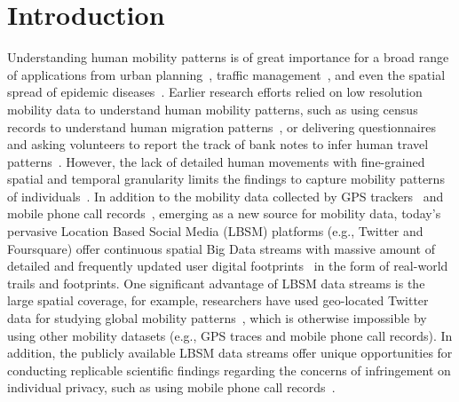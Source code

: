 \documentclass[ijgi,article,submit,moreauthors,pdftex,10pt,a4paper]{mdpi}
\theoremstyle{mdpi}
\newcounter{ex}
\newcounter{re}
\theoremstyle{mdpidefinition}
\begin{document}


\section{Introduction}
Understanding human mobility patterns is of great importance for a broad range of applications from urban planning~\cite{zheng2008understanding}, traffic management~\cite{jiang2009characterizing}, and even the spatial spread of epidemic diseases~\cite{belik2011natural}.
Earlier research efforts relied on low resolution mobility data to understand human mobility patterns, such as using census records to understand human migration patterns~\cite{greenwood1985human}, or delivering questionnaires and asking volunteers to report the track of bank notes to infer human travel patterns~\cite{brockmann2006scaling}.
However, the lack of detailed human movements with fine-grained spatial and temporal granularity limits the findings to capture mobility patterns of individuals~\cite{gonzalez2008understanding,Jurdak2015}.
In addition to the mobility data collected by GPS trackers~\cite{zheng2008understanding, rhee2011levy} and mobile phone call records~\cite{gonzalez2008understanding,sevtsuk2010does,kung2014exploring}, 
emerging as a new source for mobility data, today's pervasive Location Based Social Media (LBSM) platforms (e.g., Twitter and Foursquare) offer continuous spatial Big Data streams with massive amount of detailed and frequently updated user digital footprints~\cite{thatcher2014living} in the form of real-world trails and footprints.
One significant advantage of LBSM data streams is the large spatial coverage, for example, researchers have used geo-located Twitter data for studying global mobility patterns~\cite{hawelka2014geo}, which is otherwise impossible by using other mobility datasets (e.g., GPS traces and mobile phone call records). 
In addition, the publicly available LBSM data streams offer unique opportunities for conducting replicable scientific findings regarding the concerns of infringement on individual privacy, such as using mobile phone call records~\cite{giannotti2008mobility,crampton2014collect,Jurdak2015}.
\end{document}
